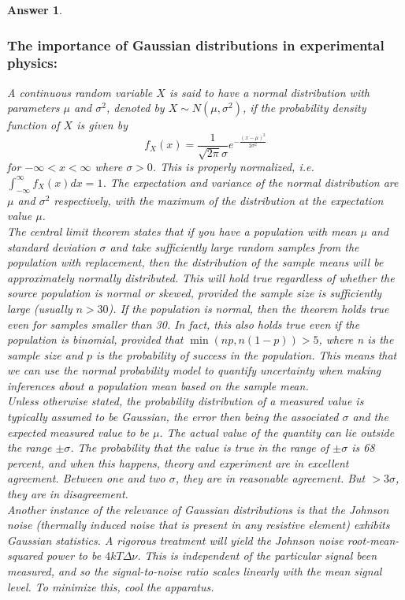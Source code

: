 \documentclass[a4paper]{article}
\newtheorem{ans}{Answer}[subsection]
\theoremstyle{new}
\begin{document}
\begin{ans}
\subsubsection*{The importance of Gaussian distributions in experimental physics:}
A continuous random variable $X$ is said to have a normal distribution with parameters $\mu$ and $\sigma^2$, denoted by $X\sim N(\mu,\sigma^2)$, if the probability density function of $X$ is given by
$$f_X(x)=\frac{1}{\sqrt{2\pi}\sigma}e^{-\frac{(x-\mu)^2}{2\sigma^2}}$$
for $-\infty<x<\infty$ where $\sigma>0$. This is properly normalized, i.e. $\int_{-\infty}^\infty f_X(x)dx=1$. The expectation and variance of the normal distribution are $\mu$ and $\sigma^2$ respectively, with the maximum of the distribution at the expectation value $\mu$.\\[5pt]
The central limit theorem states that if you have a population with mean $\mu$ and standard deviation $\sigma$ and take sufficiently large random samples from the population with replacement, then the distribution of the sample means will be approximately normally distributed. This will hold true regardless of whether the source population is normal or skewed, provided the sample size is sufficiently large (usually $n > 30$). If the population is normal, then the theorem holds true even for samples smaller than 30. In fact, this also holds true even if the population is binomial, provided that $\min(np, n(1-p))> 5$, where n is the sample size and $p$ is the probability of success in the population. This means that we can use the normal probability model to quantify uncertainty when making inferences about a population mean based on the sample mean.\\[5pt]
Unless otherwise stated, the probability distribution of a measured value is typically assumed to be Gaussian, the error then being the associated $\sigma$ and the expected measured value to be $\mu$. The actual value of the quantity can lie outside the range $\pm\sigma$. The probability that the value is true in the range of $\pm\sigma$ is 68 percent, and when this happens, theory and experiment are in excellent agreement. Between one and two $\sigma$, they are in reasonable agreement. But $>3\sigma$, they are in disagreement.\\[5pt]
Another instance of the relevance of Gaussian distributions is that the Johnson noise (thermally induced noise that is present in any resistive element) exhibits Gaussian statistics. A rigorous treatment will yield the Johnson noise root-mean-squared power to be $4kT\Delta\nu$. This is independent of the particular signal been measured, and so the signal-to-noise ratio scales linearly with the mean signal level. To minimize this, cool the apparatus.
\end{ans}
\newpage
\end{document}
